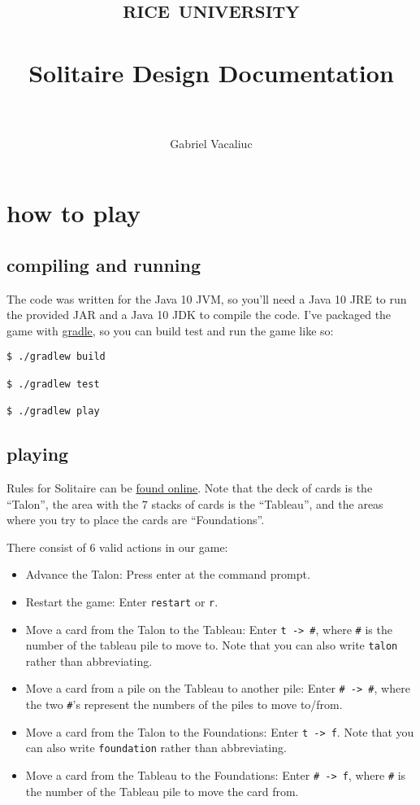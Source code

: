 \documentclass[paper=letter, fontsize=12pt]{article}
\title{	
\normalfont \normalsize 
\textsc{rice university} \\ [25pt]
\horrule{0.5pt} \\[0.4cm] %
\huge Solitaire Design Documentation \\ %
\horrule{2pt} \\[0.5cm] %
}
\author{Gabriel Vacaliuc}
\numberwithin{equation}{section} %
\numberwithin{figure}{section} %
\numberwithin{table}{section} %
\begin{document}
\maketitle


\section{how to play}

\subsection{compiling and running}

The code was written for the Java 10 JVM, so you'll need a Java 10 JRE to run 
the provided JAR and a Java 10 JDK to compile the code.  I've packaged the 
game with \href{https://gradle.org/}{gradle}, so you can build test and run the
game like so:

\begin{verbatim}
$ ./gradlew build

$ ./gradlew test

$ ./gradlew play
\end{verbatim}

\subsection{playing}

Rules for Solitaire can be
\href{https://www.bicyclecards.com/how-to-play/solitaire/}{found online}.
Note that the deck of cards is the ``Talon'', the area with the 7 stacks of
cards is the ``Tableau'', and the areas where you try to place the cards are
``Foundations''.

There consist of 6 valid actions in our game:
\begin{itemize}
  \item Advance the Talon: Press enter at the command prompt.
  \item Restart the game: Enter \texttt{restart} or \texttt{r}.
  \item Move a card from the Talon to the Tableau: Enter \texttt{t -> \#},
    where \texttt{\#} is the number of the tableau pile to move to. Note that
    you can also write \texttt{talon} rather than abbreviating.
  \item Move a card from a pile on the Tableau to another pile: Enter
    \texttt{\# -> \#}, where the two \texttt{\#}'s represent the numbers of the
    piles to move to/from.
  \item Move a card from the Talon to the Foundations: Enter \texttt{t -> f}.
    Note that you can also write \texttt{foundation} rather than abbreviating.
  \item Move a card from the Tableau to the Foundations: Enter \texttt{\# -> f},
    where \texttt{\#} is the number of the Tableau pile to move the card from.
\end{itemize}
\end{document}
